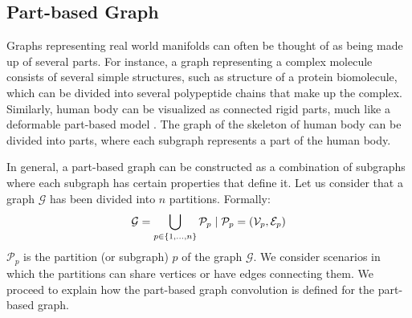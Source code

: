\documentclass{bmvc2k}
\begin{document}
\subsection{Part-based Graph}
\label{sec:3_1}
Graphs representing real world manifolds can often be thought of as being made up of several parts. For instance, a graph representing a complex molecule consists of several simple structures, such as structure of a protein biomolecule, which can be divided into several polypeptide chains that make up the complex. Similarly, human body can be visualized as connected rigid parts, much like a deformable part-based model \cite{Felzenszwalb:2005}. The graph of the skeleton of human body can be divided into parts, where each subgraph represents a part of the human body.

In general, a part-based graph can be constructed as a combination of subgraphs where each subgraph has certain properties that define it. Let us consider that a graph $\mathcal{G}$ has been divided into $n$ partitions. Formally:
\begingroup
\small
\begin{align}
    \mathcal{G} = \bigcup_{p \in \{1,\ldots,n\}} \mathcal{P}_p \hspace{0.1cm} | \hspace{0.1cm} \mathcal{P}_p = (\mathcal{V}_p, \mathcal{E}_p) \label{eq:partgraph}
\end{align}
\endgroup
$\mathcal{P}_p$ is the partition (or subgraph) $p$ of the graph $\mathcal{G}$. We consider scenarios in which the partitions can share vertices or have edges connecting them. We proceed to explain how the part-based graph convolution is defined for the part-based graph.
\end{document}
